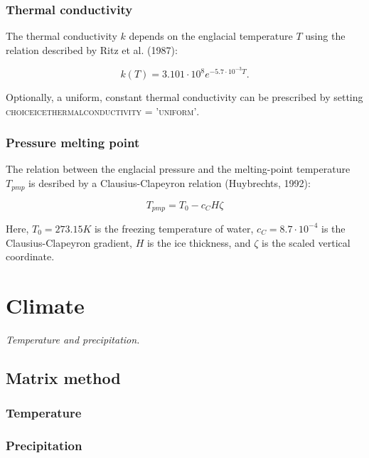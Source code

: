\documentclass{article}
\begin{document}
\subsubsection{Thermal conductivity}

The thermal conductivity $k$ depends on the englacial temperature $T$ using the relation described by Ritz et al. (1987):

\begin{equation}
k \left( T \right) = 3.101 \cdot 10^8 e^{-5.7 \cdot 10^{-3} T}.
\end{equation}

Optionally, a uniform, constant thermal conductivity can be prescribed by setting \textsc{choice\textunderscore ice\textunderscore thermal\textunderscore conductivity = 'uniform'}.

\subsubsection{Pressure melting point}

The relation between the englacial pressure and the melting-point temperature $T_{pmp}$ is desribed by a Clausius-Clapeyron relation (Huybrechts, 1992):

\begin{equation}
T_{pmp} = T_0 - c_C H \zeta
\end{equation}

Here, $T_0 = 273.15 K$ is the freezing temperature of water, $c_C = 8.7 \cdot 10^{-4}$ is the Clausius-Clapeyron gradient, $H$ is the ice thickness, and $\zeta$ is the scaled vertical coordinate.

\newpage
\section{Climate}

\textit{Temperature and precipitation.}

\subsection{Matrix method}

\subsubsection{Temperature}

\subsubsection{Precipitation}
\end{document}
